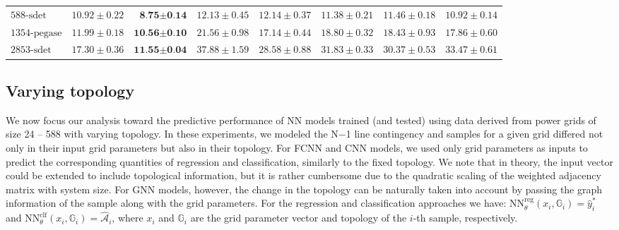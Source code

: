 \documentclass[journal]{IEEEtran}
\def\nmo{N$-$1}%
\begin{document}
\begin{table*}[!ht]
\begin{tabular}{lr|rrrrrr}
    $\textrm{588-sdet}$ & $10.92 \pm 0.22$ & $\textbf{8.75} \boldsymbol{\pm} \textbf{0.14}$ & $12.13 \pm 0.45$ & $12.14 \pm 0.37$ & $11.38 \pm 0.21$ & $11.46 \pm 0.18$ & $10.92 \pm 0.14$ \\
    $\textrm{1354-pegase}$ & $11.99 \pm 0.18$ & $\textbf{10.56} \boldsymbol{\pm} \textbf{0.10}$ & $21.56 \pm 0.98$ & $17.14 \pm 0.44$ & $18.80 \pm 0.32$ & $18.43 \pm 0.93$ & $17.86 \pm 0.60$ \\
    $\textrm{2853-sdet}$ & $17.30 \pm 0.36$ & $\textbf{11.55} \boldsymbol{\pm} \textbf{0.04}$ & $37.88 \pm 1.59$ & $28.58 \pm 0.88$ & $31.83 \pm 0.33$ & $30.37 \pm 0.53$ & $33.47 \pm 0.61$ \\
    \bottomrule
    \end{tabular}
\end{table*}

\subsection{Varying topology}
We now focus our analysis toward the predictive performance of NN models trained (and tested) using data derived from power grids of size 24 -- 588 with varying topology. 
In these experiments, we modeled the \nmo{} line contingency and samples for a given grid differed not only in their input grid parameters but also in their topology.
For FCNN and CNN models, we used only grid parameters as inputs to predict the corresponding quantities of regression and classification, similarly to the fixed topology. We note that in theory, the input vector could be extended to include topological information, but it is rather cumbersome due to the quadratic scaling of the weighted adjacency matrix with system size.
For GNN models, however, the change in the topology can be naturally taken into account by passing the graph information of the sample along with the grid parameters. For the regression and classification approaches we have: $\mathrm{NN}_{\theta}^{\mathrm{reg}}(x_{i}, \mathbb{G}_{i}) = \hat{y}_{i}^{*}$ and $\mathrm{NN}_{\theta}^{\mathrm{clf}}(x_{i}, \mathbb{G}_{i}) = \hat{\mathcal{A}}_{i}$, where $x_{i}$ and $\mathbb{G}_{i}$ are the grid parameter vector and topology of the $i$-th sample, respectively.
\end{document}
